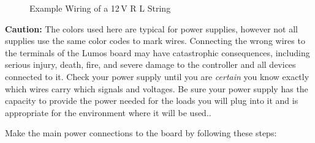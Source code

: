 \documentclass[letterpaper,twoside,onecolumn,openright,final]{memoir}
\begin{document}
\begin{figure}
\begin{center}
	\caption{Example Wiring of a 12\,V R L String\label{fig:ledconn}}
    \end{center}
\end{figure}

{\bfseries Caution:}
The colors used here are typical for  power supplies, however
not all supplies use the same color codes to mark wires.  Connecting the wrong wires to the terminals
of the Lumos board may have catastrophic consequences, including serious injury, death, fire, and severe damage
to the controller and all devices connected to it.  Check your power supply until you are \emph{certain} you know
exactly which wires carry which signals and voltages.  Be sure your power supply has the capacity to provide the
power needed for the loads you will plug into it and is appropriate for the environment where it will be used..

Make the main power connections to the board by following these steps:
\end{document}
